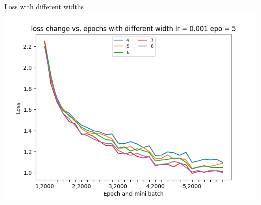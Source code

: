 \begin{frame}{Loss with different widths}
    \includegraphics[scale=.6]{images/loss change vs. epochs with different width lr 0.001 epo 5.png}
\end{frame}



